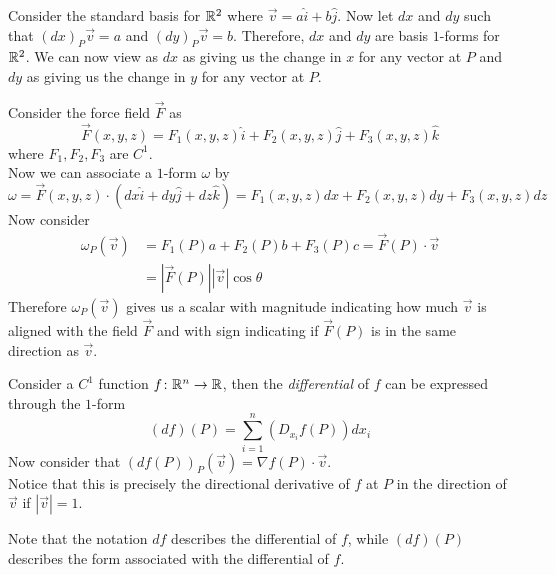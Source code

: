 \documentclass[notes.tex]{subfiles}
\begin{document}
\begin{example}
    Consider the standard basis for $\mathbb{R}^2$ where $\vec{v} = a\hat{i} + b\hat{j}$. Now let $dx$ and $dy$ such that $(dx)_P\vec{v} = a$ and $(dy)_P\vec{v} = b$. Therefore, $dx$ and $dy$ are basis $1$-forms for $\mathbb{R}^2$. We can now view as $dx$ as giving us the change in $x$ for any vector at $P$ and $dy$ as giving us the change in $y$ for any vector at $P$.
\end{example}

\begin{example}
    Consider the force field $\vec{F}$ as
    \[
        \vec{F}(x, y, z) = F_1(x, y, z)\hat{i} + F_2(x, y, z)\hat{j} + F_3(x, y, z)\hat{k}
    \]
    where $F_1, F_2, F_3$ are $C^1$. \\
    Now we can associate a $1$-form $\omega$ by
    \[
        \omega = \vec{F}(x, y, z)\cdot(dx\hat{i} + dy\hat{j} + dz\hat{k}) = F_1(x, y, z)dx + F_2(x, y, z)dy + F_3(x, y, z)dz
    \]
    Now consider
    \begin{align*}
        \omega_P(\vec{v})
        &= F_1(P)a + F_2(P)b + F_3(P)c
        = \vec{F}(P)\cdot\vec{v} \\
        &= |\vec{F}(P)||\vec{v}|\cos\theta
    \end{align*}
    Therefore $\omega_P(\vec{v})$ gives us a scalar with magnitude indicating how much $\vec{v}$ is aligned with the field $\vec{F}$ and with sign indicating if $\vec{F}(P)$ is in the same direction as $\vec{v}$.
\end{example}

\begin{definition}[Differential]
    Consider a $C^1$ function $f\colon \mathbb{R}^n \to \mathbb{R}$, then the \textit{differential} of $f$ can be expressed through the $1$-form
    \[
        (df)(P) = \sum_{i = 1}^n (D_{x_i}f(P)) dx_i
    \]
    Now consider that $(df(P))_P(\vec{v}) = \nabla f(P)\cdot \vec{v}$. \\
    Notice that this is precisely the directional derivative of $f$ at $P$ in the direction of $\vec{v}$ if $|\vec{v}| = 1$.
\end{definition}

Note that the notation $df$ describes the differential of $f$, while $(df)(P)$ describes the form associated with the differential of $f$.
\end{document}

